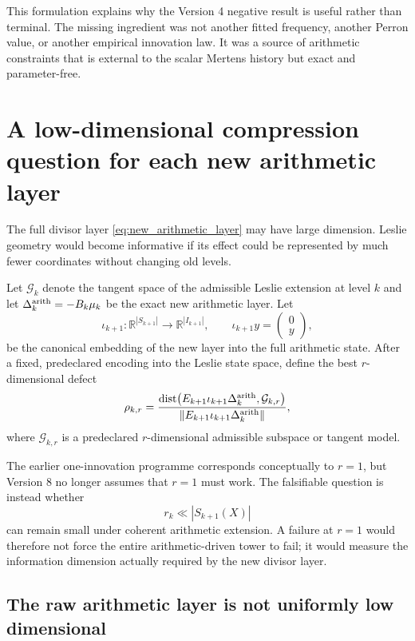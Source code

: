 \documentclass[11pt]{amsart}
\numberwithin{equation}{section}
\theoremstyle{plain}
\theoremstyle{definition}
\theoremstyle{remark}
\begin{document}
This formulation explains why the Version 4 negative result is useful rather than terminal.
The missing ingredient was not another fitted frequency, another Perron value, or another
empirical innovation law.  It was a source of arithmetic constraints that is external to the
scalar Mertens history but exact and parameter-free.


\section{A low-dimensional compression question for each new arithmetic layer}
\label{sec:layer_compression_question}

The full divisor layer \eqref{eq:new_arithmetic_layer} may have large dimension.  Leslie
geometry would become informative if its effect could be represented by much fewer coordinates
without changing old levels.

Let $\mathcal G_k$ denote the tangent space of the admissible Leslie extension at level $k$ and
let $\Delta_k^{\rm arith}=-B_k\mu_k$ be the exact new arithmetic layer.  Let
\[
\iota_{k+1}:\mathbb R^{|S_{k+1}|}\to\mathbb R^{|I_{k+1}|},
\qquad
\iota_{k+1}y=
\begin{pmatrix}0\\y\end{pmatrix},
\]
be the canonical embedding of the new layer into the full arithmetic state.  After a fixed,
predeclared encoding into the Leslie state space, define the best $r$-dimensional defect
\begin{equation}
\rho_{k,r}
=
\frac{
\operatorname{dist}\!\left(
E_{k+1}\iota_{k+1}\Delta_k^{\rm arith},
\mathcal G_{k,r}
\right)
}{
\|E_{k+1}\iota_{k+1}\Delta_k^{\rm arith}\|
},
\label{eq:layer_compression_defect}
\end{equation}
where $\mathcal G_{k,r}$ is a predeclared $r$-dimensional admissible subspace or tangent model.

The earlier one-innovation programme corresponds conceptually to $r=1$, but Version 8 no longer
assumes that $r=1$ must work.  The falsifiable question is instead whether
\[
r_k\ll |S_{k+1}(X)|
\]
can remain small under coherent arithmetic extension.  A failure at $r=1$ would therefore not
force the entire arithmetic-driven tower to fail; it would measure the information dimension
actually required by the new divisor layer.



\subsection{The raw arithmetic layer is not uniformly low dimensional}
\label{subsec:v9_raw_layer_rank}
\end{document}
